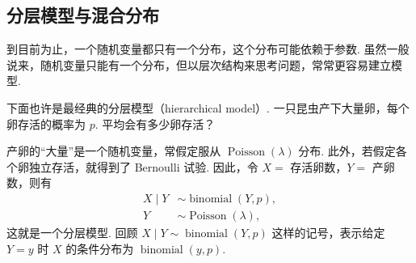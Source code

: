 \subsection{分层模型与混合分布}\label{sec:4.4}
到目前为止，一个随机变量都只有一个分布，这个分布可能依赖于参数. 虽然一般说来，随机变量只能有一个分布，但以层次结构来思考问题，常常更容易建立模型.
\begin{example}[二项--Poisson 层次]\label{ex:4.4.1}
下面也许是最经典的分层模型（hierarchical model）. 一只昆虫产下大量卵，每个卵存活的概率为 $p$. 平均会有多少卵存活？

产卵的“大量”是一个随机变量，常假定服从 $\operatorname{Poisson}(\lambda)$ 分布. 此外，若假定各个卵独立存活，就得到了 Bernoulli 试验. 因此，令 $X=$ 存活卵数，$Y=$ 产卵数，则有
$$\begin{aligned}X\mid Y&\sim\operatorname{binomial}(Y,p),\\Y&\sim\operatorname{Poisson}(\lambda),\end{aligned}$$
这就是一个分层模型. 回顾 $X\mid Y\sim\operatorname{binomial}(Y,p)$ 这样的记号，表示给定 $Y=y$ 时 $X$ 的条件分布为 $\operatorname{binomial}(y,p)$.
\end{example}

